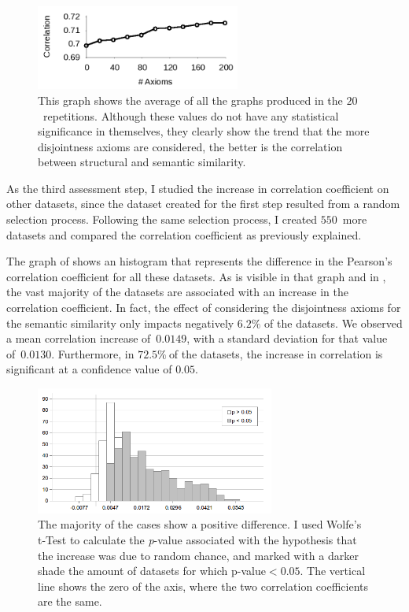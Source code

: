 \begin{figure}[p]
    \centering
    \includegraphics[width=0.6\textwidth]{images/trend.png}
    \caption[The trend corresponding to all the repetitions]{This graph shows the average of all the graphs produced in the $20$~repetitions. Although these values do not have any statistical significance in themselves, they clearly show the trend that the more disjointness axioms are considered, the better is the correlation between structural and semantic similarity.}
    \label{fig:evolution-trend}
\end{figure}


 As the third assessment step, I studied the increase in correlation coefficient on other datasets, since the dataset created for the first step resulted from a random selection process. Following the same selection process, I created $550$~more datasets and compared the correlation coefficient as previously explained.

The graph of  shows an histogram that represents the difference in the Pearson's correlation coefficient for all these datasets. As is visible in that graph and in , the vast majority of the datasets are associated with an increase in the correlation coefficient. In fact, the effect of considering the disjointness axioms for the semantic similarity only impacts negatively $6.2\%$ of the datasets. We observed a mean correlation increase of~$0.0149$, with a standard deviation for that value of~$0.0130$. Furthermore, in $72.5\%~$of the datasets, the increase in correlation is significant at a confidence value of $0.05$.

\begin{figure}[p]
    \centering
    \includegraphics[width=0.7\textwidth]{images/histogram.png}
    \caption[Distribution of the difference in correlation coefficient for random datasets]{The majority of the cases show a positive difference. I used Wolfe's t-Test to calculate the \emph{p}-value associated with the hypothesis that the increase was due to random chance, and marked with a darker shade the amount of datasets for which p-value${}<0.05$. The vertical line shows the zero of the axis, \ie where the two correlation coefficients are the same.}
    \label{fig:histogram}
\end{figure}

